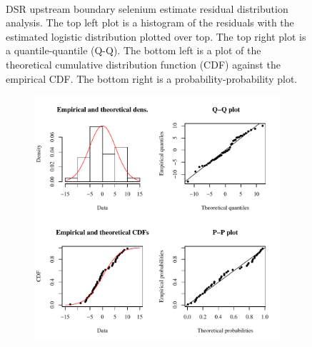 \begin{linenumbers}
\begin{landscape}
\begin{figure}
\begin{subfigure}{0.7\textwidth}
		\end{subfigure}\\
		\caption[DSR upstream boundary selenium estimate residual distribution analysis.]{DSR upstream boundary selenium estimate residual distribution analysis.  The top left plot is a histogram of the residuals with the estimated logistic distribution plotted over top.  The top right plot is a quantile-quantile (Q-Q).  The bottom left is a plot of the theoretical cumulative distribution function (CDF) against the empirical CDF.  The bottom right is a probability-probability plot.}
		\label{fig:concRes-Fit_DS}
	\end{figure}
\end{landscape}

\subfiguremid
\begin{landscape}
	\begin{figure}
		\begin{subfigure}{0.7\textwidth}
			\centering
			\includegraphics[width=\tableCustomSize]{"Figures/Results_DSR/Stochastic/Conc Model res-fit BIG"}
		\end{subfigure}%
		\begin{subfigure}{0.7\textwidth}
			\centering

\end{subfigure}
\end{figure}
\end{landscape}
\end{linenumbers}
